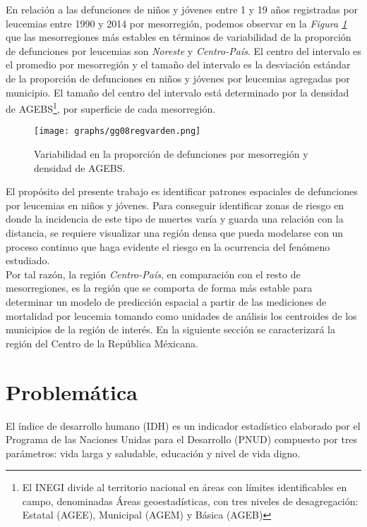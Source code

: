 \documentclass[11pt, oneside]{book}
\begin{document}
En relación a las defunciones de niños y jóvenes entre 1 y 19 años registradas por leucemias entre 1990 y 2014 por mesorregión, podemos observar en la \emph{Figura \ref{fig8.var}} que las mesorregiones más estables en términos de variabilidad de la proporción de defunciones por leucemias son \emph{Noreste} y \emph{Centro-País}. El centro del intervalo es el promedio por mesorregión y el tamaño del intervalo es la desviación estándar de la proporción de defunciones en niños y jóvenes por leucemias agregadas por municipio. El tamaño del centro del intervalo está determinado por la densidad de AGEBS\footnote{El INEGI divide al territorio nacional en áreas con límites identificables en campo, denominadas Áreas geoestadísticas, con tres niveles de desagregación: Estatal (AGEE), Municipal (AGEM) y Básica (AGEB)}, por superficie de cada mesorregión.\\


\begin{figure}[ht]
    \centering
    \texttt{[image: graphs/gg08regvarden.png]}
  \caption{Variabilidad en la proporción de defunciones por mesorregión y densidad de AGEBS.}
  \label{fig8.var}
\end{figure}

El propósito del presente trabajo es identificar patrones espaciales de defunciones por leucemias en niños y jóvenes. Para conseguir identificar zonas de riesgo en donde la incidencia de este tipo de muertes varía y guarda una relación con la distancia, se requiere visualizar una región densa que pueda modelarse con un proceso continuo que haga evidente el riesgo en la ocurrencia del fenómeno estudiado.\\ 

Por tal razón, la región \emph{Centro-País}, en comparación con el resto de mesorregiones, es la región que se comporta de forma más estable para determinar un modelo de predicción espacial a partir de las mediciones de mortalidad por leucemia tomando como unidades de análisis los centroides de los municipios de la región de interés. En la siguiente sección se caracterizará la región del Centro de la República Méxicana.

\thispagestyle{empty}



\let\cleardoublepage\clearpage
\chapter{Problemática}
El índice de desarrollo humano (IDH) es un indicador estadístico elaborado por el Programa de las Naciones Unidas para el Desarrollo (PNUD) compuesto por tres parámetros: vida larga y saludable, educación y nivel de vida digno.\\
\end{document}
